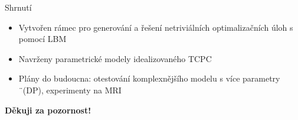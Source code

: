 \documentclass[aspectratio=169,xcolor=dvipsnames]{beamer}
\begin{document}
\begin{frame}{Shrnutí}

	\begin{itemize}
		\setlength\itemsep{1.1em}
		\item Vytvořen rámec pro generování a řešení netriviálních optimalizačních úloh s pomocí LBM
		\item Navrženy parametrické modely idealizovaného TCPC
		\item Plány do budoucna: otestování komplexnějšího modelu s více parametry ¨(DP), experimenty na MRI
	\end{itemize}
	\vfill%
	\huge{\centerline{\textbf{Děkuji za pozornost!}}}
\end{frame}
%
%
\end{document}
